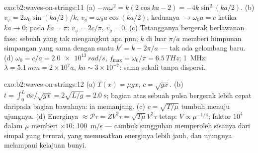 \begin{solution}{exo:b2:waves-on-strings:11}
(a) $-m\omega^2 = k(2\cos ka - 2) = -4k\sin^2(ka/2)$. (b) $v_\varphi = 2\omega_0\sin(ka/2)
/k$, $v_g = \omega_0a\cos(ka/2)$; keduanya $\to \omega_0a = c$ ketika $ka \to 0$; pada $ka = \pi$:
$v_\varphi = 2c/\pi$, $v_g = 0$. (c) Tetangganya bergerak berlawanan fase: sebuah  yang tak mengangkut apa pun; $k$ di luar $\pi/a$ memberi himpunan
simpangan yang sama dengan suatu $k' = k - 2\pi/a$ --- tak ada gelombang baru. (d) $\omega_0 = c/a =
\qty{2.0e13}{rad/s}$, $f_{\max} = \omega_0/\pi = \qty{6.5}{THz}$; \qty{1}{MHz}: $\lambda =
\qty{5.1}{mm} = 2 \times 10^7a$, $ka \sim 3 \times 10^{-7}$: sama sekali tanpa dispersi.
\end{solution}

\begin{solution}{exo:b2:waves-on-strings:12}
(a) $T(x) = \mu gx$, $c = \sqrt{gx}$. (b) $t = \int_0^L\dd x/\sqrt{gx} = 2\sqrt{L/g} =
\qty{2.0}{s}$; bagian atas sebuah pulsa bergerak lebih cepat daripada bagian bawahnya: ia
memanjang. (c) $c = \sqrt{T/\mu}$ tumbuh menuju ujungnya. (d) Energinya $\approx
\mathcal P\tau = ZV^2\tau = \sqrt{T\mu}V^2\tau$ tetap: $V \propto \mu^{-1/4}$; faktor
$10^4$ dalam $\mu$ memberi $\times10$: \qty{100}{m/s} --- cambuk sungguhan memperoleh
sisanya dari simpal yang terurai, yang memusatkan energinya
lebih jauh, dan ujungnya melampaui kelajuan bunyi.
\end{solution}

